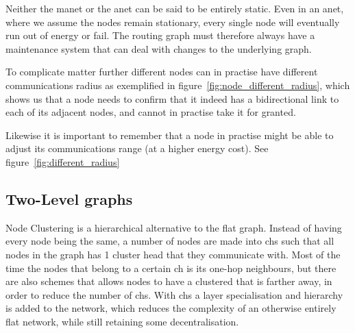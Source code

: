 Neither the \ac{manet} or the \ac{anet} can be said to be entirely static. Even in an \ac{anet}, where we assume the nodes remain stationary, every single node will eventually run out of energy or fail. The routing graph must therefore always have a maintenance system that can deal with changes to the underlying graph. 

To complicate matter further different nodes can in practise have different communications radius as exemplified in figure~\ref{fig:node_different_radius}, which shows us that a node needs to confirm that it indeed has a bidirectional link to each of its adjacent nodes, and cannot in practise take it for granted.


Likewise it is important to remember that a node in practise might be able to adjust its communications range (at a higher energy cost). See figure~\ref{fig:different_radius}

\subsection{Two-Level graphs}


\label{section:cluster_methods}
Node Clustering is a hierarchical alternative to the flat graph. Instead of having every node being the same, a number of nodes are made into \acp{ch} such that all nodes in the graph has 1 cluster head that they communicate with. Most of the time the nodes that belong to a certain \ac{ch} is its one-hop neighbours, but there are also schemes that allows nodes to have a clustered that is farther away, in order to reduce the number of \acp{ch}. With \acp{ch} a layer specialisation and hierarchy is added to the network, which reduces the complexity of an otherwise entirely flat network, while still retaining some decentralisation.


